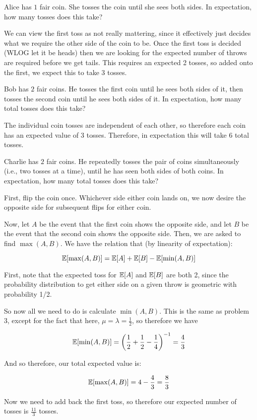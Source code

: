 \documentclass[11pt]{article}
\begin{document}
\begin{Parts}
	\Part Alice has $1$ fair coin. She tosses the coin until she sees both sides. In expectation, how many tosses does this take?

	\begin{solution}
		We can view the first toss as not really mattering, since it effectively just decides what we require the other side of the coin to be. Once the first toss is decided (WLOG let it be heads) then we are looking for the expected number of throws are required before we get tails. This requires an expected 2 tosses, so added onto the first, we expect this to take 3 tosses.
	\end{solution}

	\Part Bob has $2$ fair coins. He tosses the first coin until he sees both sides of it, then tosses the second coin until he sees both sides of it. In expectation, how many total tosses does this take?

	\begin{solution}
		The individual coin tosses are independent of each other, so therefore each coin has an expected value of 3 tosses. Therefore, in expectation this will take 6 total tosses.
	\end{solution}

	\Part Charlie has $2$ fair coins. He repeatedly tosses the pair of coins simultaneously (i.e., two tosses at a time), until he has seen both sides of both coins. In expectation, how many total tosses does this take?

	\begin{solution}
		First, flip the coin once. Whichever side either coin lands on, we now desire the opposite side for subsequent flips for either coin. 

		Now, let $A$ be the event that the first coin shows the opposite side, and let $B$ be the event that the second coin shows the opposite side. Then, we are asked to find $\max(A, B)$. We have the relation that (by linearity of expectation):

		\[ \operatorname{\mathbb{E}}[\max(A, B)] = \operatorname{\mathbb{E}}[A] + \operatorname{\mathbb{E}}[B] - \operatorname{\mathbb{E}}[\min(A, B)]\]

		First, note that the expected toss for $\operatorname{\mathbb{E}}[A]$ and $\operatorname{\mathbb{E}}[B]$ are both 2, since the probability distribution to get either side on a given throw is geometric with probability 1/2. 

		So now all we need to do is calculate $\min(A, B)$. This is the same as problem 3, except for the fact that here, $\mu = \lambda = \frac{1}{2}$, so therefore we have 

		\[ \operatorname{\mathbb{E}}[\min(A, B)] = \left(\frac{1}{2} + \frac{1}{2} - \frac{1}{4}\right)^{-1} = \frac{4}{3}\]

		And so therefore, our total expected value is: 

		\[ \operatorname{\mathbb{E}}[\max(A, B)] = 4 - \frac{4}{3} = \frac{8}{3}\]

		Now we need to add back the first toss, so therefore our expected number of tosses is $\frac{11}{3}$ tosses.
	\end{solution}
\end{Parts}
\end{document}
